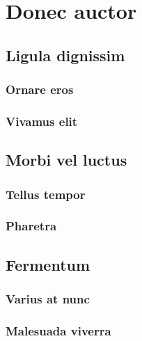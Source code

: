 \chapter{Donec auctor}
	\section{Ligula dignissim}
		\subsection{Ornare eros}
			\lipsum[18-20]
		\subsection{Vivamus elit}
			\lipsum[21-22]
	\section{Morbi vel luctus}
		\subsection{Tellus tempor}
			\lipsum[23-24]
		\subsection{Pharetra}
			\lipsum[25-26]
	\section{Fermentum}
		\subsection{Varius at nunc}
			\lipsum[27-29]
		\subsection{Malesuada viverra}
			\lipsum[30-32]
